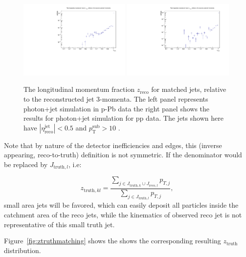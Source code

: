\begin{figure}
\center
\includegraphics[width=0.49\textwidth]{JetReco/zreco_pPb}
\includegraphics[width=0.49\textwidth]{JetReco/zreco_pp}\\
\label{fig:zmatching_reco}
\caption{The longitudinal momentum fraction $z_{\mathrm{reco}}$ for matched jets, relative to the reconstructed jet 3-momenta. The left panel represents photon+jet simulation in p-Pb data the right panel shows the results for photon+jet simulation for pp data. The jets shown here have $|\eta^{\mathrm{jet}}_{\mathrm{reco}}|<0.5$ and $p_{\mathrm{T}}^{\mathrm{sub}}> 10$ \GeVc.}
\end{figure}

Note that by nature of the detector inefficiencies and edges, this
(inverse appearing, reco-to-truth) definition is not symmetric. If the
denominator would be replaced by $J_{\mathrm{truth},l}$, i.e:

\begin{equation}
  z_{\mathrm{truth},kl} = \frac{\sum_{j \in J_{\mathrm{truth},k} \cup
      J_{\mathrm{reco},l}} p_{T,j}}{\sum_{j \in J_{\mathrm{truth},l}}
    p_{T,j}}, 
\end{equation}
small area jets will be favored, which can easily deposit all particles inside
the catchment area of the reco jets, while the kinematics of observed
reco jet is not representative of this small truth jet.

Figure~\ref{fig:ztruthmatching} shows the  shows the corresponding resulting $z_{\mathrm{truth}}$ distribution. 


